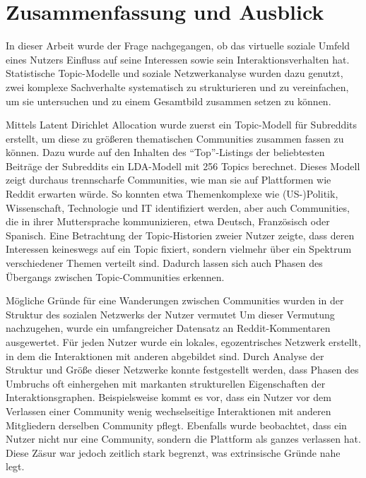 \documentclass[11pt,a4paper,twoside]{article}
\begin{document}
\hypertarget{zusammenfassung}{%
\section{Zusammenfassung und Ausblick}\label{zusammenfassung}}

In dieser Arbeit wurde der Frage nachgegangen, ob das virtuelle soziale
Umfeld eines Nutzers Einfluss auf seine Interessen sowie sein
Interaktionsverhalten hat. Statistische Topic-Modelle und soziale
Netzwerkanalyse wurden dazu genutzt, zwei komplexe Sachverhalte
systematisch zu strukturieren und zu vereinfachen, um sie untersuchen
und zu einem Gesamtbild zusammen setzen zu können.

Mittels Latent Dirichlet Allocation wurde zuerst ein Topic-Modell für
Subreddits erstellt, um diese zu größeren thematischen Communities
zusammen fassen zu können. Dazu wurde auf den Inhalten des
\enquote{Top}-Listings der beliebtesten Beiträge der Subreddits ein
LDA-Modell mit 256 Topics berechnet. Dieses Modell zeigt durchaus
trennscharfe Communities, wie man sie auf Plattformen wie Reddit
erwarten würde. So konnten etwa Themenkomplexe wie (US-)Politik,
Wissenschaft, Technologie und IT identifiziert werden, aber auch
Communities, die in ihrer Muttersprache kommunizieren, etwa Deutsch,
Französisch oder Spanisch. Eine Betrachtung der Topic-Historien zweier
Nutzer zeigte, dass deren Interessen keineswegs auf ein Topic fixiert,
sondern vielmehr über ein Spektrum verschiedener Themen verteilt sind.
Dadurch lassen sich auch Phasen des Übergangs zwischen Topic-Communities
erkennen.

Mögliche Gründe für eine Wanderungen zwischen Communities wurden in der
Struktur des sozialen Netzwerks der Nutzer vermutet Um dieser Vermutung
nachzugehen, wurde ein umfangreicher Datensatz an Reddit-Kommentaren
ausgewertet. Für jeden Nutzer wurde ein lokales, egozentrisches Netzwerk
erstellt, in dem die Interaktionen mit anderen abgebildet sind. Durch
Analyse der Struktur und Größe dieser Netzwerke konnte festgestellt
werden, dass Phasen des Umbruchs oft einhergehen mit markanten
strukturellen Eigenschaften der Interaktionsgraphen. Beispielsweise
kommt es vor, dass ein Nutzer vor dem Verlassen einer Community wenig
wechselseitige Interaktionen mit anderen Mitgliedern derselben Community
pflegt. Ebenfalls wurde beobachtet, dass ein Nutzer nicht nur eine
Community, sondern die Plattform als ganzes verlassen hat. Diese Zäsur
war jedoch zeitlich stark begrenzt, was extrinsische Gründe nahe legt.
\end{document}
